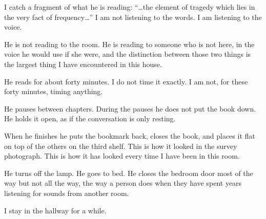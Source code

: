 I catch a fragment of what he is reading: ``\ldots the element of tragedy which lies in the very fact of frequency\ldots'' I am not listening to the words. I am listening to the voice.

He is not reading to the room. He is reading to someone who is not here, in the voice he would use if she were, and the distinction between those two things is the largest thing I have encountered in this house.

He reads for about forty minutes. I do not time it exactly. I am not, for these forty minutes, timing anything.

He pauses between chapters. During the pauses he does not put the book down. He holds it open, as if the conversation is only resting.

When he finishes he puts the bookmark back, closes the book, and places it flat on top of the others on the third shelf. This is how it looked in the survey photograph. This is how it has looked every time I have been in this room.

He turns off the lamp. He goes to bed. He closes the bedroom door most of the way but not all the way, the way a person does when they have spent years listening for sounds from another room.

I stay in the hallway for a while.
